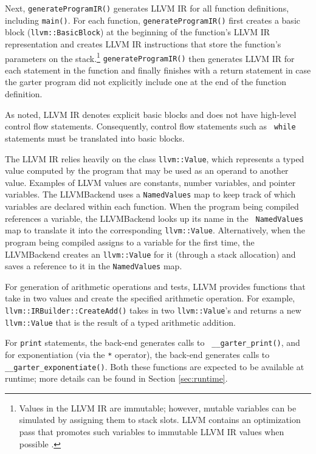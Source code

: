 \documentclass[11pt]{article}
\begin{document}
Next, {\tt generateProgramIR()} generates LLVM
IR for all function definitions, including {\tt main()}.
For each function, {\tt generateProgramIR()} first creates a basic block ({\tt llvm::BasicBlock}) at
the beginning of the function's LLVM IR representation and creates LLVM IR
instructions that store the function's parameters on the stack.\footnote{Values
    in the LLVM IR are immutable; however, mutable variables can be simulated by
assigning them to stack slots.  LLVM contains an optimization pass that promotes
such variables to immutable LLVM IR values when possible \cite{kaleidoscope}.}
{\tt generateProgramIR()} then generates LLVM IR for each statement in the function and
finally finishes with a return statement in case the garter program did not
explicitly include one at the end of the function definition.

As noted, LLVM IR denotes explicit basic blocks and does not have high-level
control flow statements.  Consequently, control flow statements such as {\tt
while} statements must be translated into basic blocks.

The LLVM IR relies heavily on the class {\tt llvm::Value}, which represents a
typed value computed by the program that may be used as an operand to another
value.  Examples of LLVM values are constants, number variables, and pointer
variables.  The LLVMBackend uses a {\tt NamedValues} map to keep track of which
variables are declared within each function.  When the program being compiled
references a variable, the LLVMBackend looks up its name in the {\tt
NamedValues} map to translate it into the corresponding {\tt llvm::Value}.
Alternatively, when the program being compiled assigns to a variable for the
first time, the LLVMBackend creates an {\tt llvm::Value} for it (through a stack
allocation) and saves a reference to it in the {\tt NamedValues} map.

For generation of arithmetic operations and tests, LLVM provides functions that
take in two values and create the specified arithmetic operation.  For example,
{\tt llvm::IRBuilder::CreateAdd()} takes in two {\tt llvm::Value}'s and returns
a new {\tt llvm::Value} that is the result of a typed arithmetic addition.

For {\tt print} statements, the back-end generates calls to {\tt
\_\_garter\_print()}, and for exponentiation (via the {\tt **} operator), the
back-end generates calls to {\tt \_\_garter\_exponentiate()}.  Both these
functions are
expected to be available at runtime; more details can be found in Section
\ref{sec:runtime}.
\end{document}
